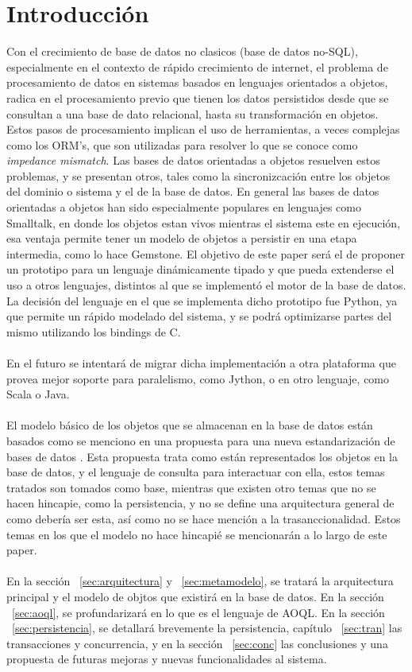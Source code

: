 \documentclass{melta}
\begin{document}
\section{Introducción}
\label{sec:introduccion}
Con el crecimiento de base de datos no clasicos (base de datos no-SQL), especialmente en el contexto de rápido crecimiento de internet, el problema de procesamiento de datos en sistemas basados en lenguajes orientados a objetos, radica en el procesamiento previo que tienen los datos persistidos desde que se consultan a una base de dato relacional, hasta su transformación en objetos. Estos pasos de procesamiento implican el uso de herramientas, a veces complejas como los ORM's, que son utilizadas para resolver lo que se conoce como \textit{impedance mismatch}\cite{arch:MFowler}.
Las bases de datos orientadas a objetos resuelven estos problemas, y se presentan otros, tales como la sincronizcación entre los objetos del dominio o sistema y el de la base de datos. 
En general las bases de datos orientadas a objetos han sido especialmente populares en lenguajes como Smalltalk, en donde los objetos estan vivos mientras el sistema este en ejecución, esa ventaja permite tener un modelo de objetos a persistir en una etapa intermedia, como lo hace Gemstone. El objetivo de este paper será el de proponer un prototipo para un lenguaje dinámicamente tipado y que pueda extenderse el uso a otros lenguajes, distintos al que se implementó el motor de la base de datos.
La decisión del lenguaje en el que se implementa dicho prototipo fue Python, ya que permite un rápido modelado del sistema, y se podrá optimizarse partes del mismo utilizando los bindings de C. 
\\\\
En el futuro se intentará de migrar dicha implementación a otra plataforma que provea mejor soporte para paralelismo, como Jython, o en otro lenguaje, como Scala o Java.
\\\\
El modelo básico de los objetos que se almacenan en la base de datos están basados como se menciono en una propuesta para una nueva estandarización de bases de datos \cite{OMG:oodbs}. Esta propuesta trata como están representados los objetos en la base de datos, y el lenguaje de consulta para interactuar con ella, estos temas tratados son tomados como base, mientras que existen otro temas que no se hacen hincapie, como la persistencia, y no se define una arquitectura general de como debería ser esta, así como no se hace mención a la trasanccionalidad. Estos temas en los que el modelo no hace hincapié se mencionarán a lo largo de este paper.
\\\\
En la sección ~\ref{sec:arquitectura} y ~\ref{sec:metamodelo}, se tratará la arquitectura principal y el modelo de objtos que existirá en la base de datos. En la sección ~\ref{sec:aoql}, se profundarizará en lo que es el lenguaje de AOQL. En la sección ~\ref{sec:persistencia}, se detallará brevemente la persistencia, capítulo ~\ref{sec:tran} las transacciones y concurrencia, y en la sección ~\ref{sec:conc} las conclusiones y una propuesta de futuras mejoras y nuevas funcionalidades al sistema. 
\end{document}
